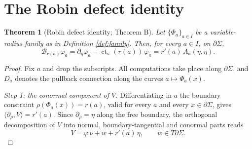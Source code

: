 \documentclass[11pt,a4paper]{amsart}
\theoremstyle{plain}
\newtheorem{theorem}{Theorem}[section]
\theoremstyle{definition}
\newcommand{\ct}{\operatorname{ct}_\kappa}
\begin{document}
\section{The Robin defect identity}\label{sec:identity}

\begin{theorem}[Robin defect identity; Theorem B]\label{thm:defect}
Let $\{\Phi_a\}_{a\in I}$ be a variable-radius family as in Definition \ref{def:family}. Then, for every $a\in I$, on $\partial\Sigma$,
\begin{equation}\label{eq:defect}
\mathcal{B}_{r(a)}\varphi_a=\partial_\eta\varphi_a-\ct(r(a))\,\varphi_a=r'(a)\,A_a(\eta,\eta).
\end{equation}
\end{theorem}

\begin{proof}
Fix $a$ and drop the subscripts. All computations take place along $\partial\Sigma$, and $D_a$ denotes the pullback connection along the curves $a\mapsto\Phi_a(x)$.

\emph{Step 1: the conormal component of $V$.} Differentiating in $a$ the boundary constraint $\rho(\Phi_a(x))=r(a)$, valid for every $a$ and every $x\in\partial\Sigma$, gives $\langle\partial_\rho,V\rangle=r'(a)$. Since $\partial_\rho=\eta$ along the free boundary, the orthogonal decomposition of $V$ into normal, boundary-tangential and conormal parts reads
\begin{equation}\label{eq:decomp}
V=\varphi\,\nu+w+r'(a)\,\eta,\qquad w\in T\partial\Sigma.
\end{equation}


\end{proof}
\end{document}
